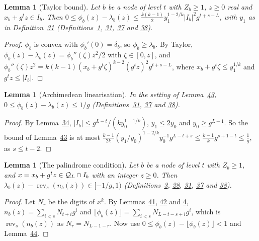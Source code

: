 \documentclass[11pt]{article}
\newcounter{hffc}
\theoremstyle{definition}\newtheorem{hffdef}[hffc]{Definition}
\theoremstyle{plain}\newtheorem{hfflem}[hffc]{Lemma}\newtheorem{hffthm}[hffc]{Theorem}
\theoremstyle{remark}\newtheorem{hffrem}[hffc]{Remark}
\newcommand{\hffcost}{}
\newcommand{\setcost}[1]{\renewcommand{\hffcost}{#1}}
\newcommand{\rev}{\operatorname{rev}}
\begin{document}
\begin{hfflem}[Taylor bound]\label{L:taylor}
Let $b$ be a node of level $t$ with $Z_b\ge1$, $z\ge0$ real and $x_b+g^tz\in I_b$. Then $0\le\phi_b(z)-\lambda_b(z)\le\frac{k(k-1)}2y_1^{1-2/k}|I_b|^2g^{t+s-L}$, with $y_1$ as in Definition~\hyperref[D:node]{31} (Definitions~\hyperref[D:conv]{1}, \hyperref[D:node]{31}, \hyperref[D:phase]{37} and \hyperref[D:arch]{38}).
\par\nopagebreak{}
\end{hfflem}
\begin{proof}\setcost{length 148/300}$\phi_b$ is convex with $\phi_b'(0)=\delta_b$, so $\phi_b\ge\lambda_b$. By Taylor, $\phi_b(z)-\lambda_b(z)=\phi_b''(\zeta)z^2/2$ with $\zeta\in[0,z]$, and $\phi_b''(\zeta)z^2=k(k-1)(x_b+g^t\zeta)^{k-2}(g^tz)^2g^{t+s-L}$, where $x_b+g^t\zeta\le y_1^{1/k}$ and $g^tz\le|I_b|$.
\end{proof}

\begin{hfflem}[Archimedean linearisation]\label{L:arch}
In the setting of Lemma~\hyperref[L:taylor]{43}, $0\le\phi_b(z)-\lambda_b(z)\le1/g$ (Definitions~\hyperref[D:node]{31}, \hyperref[D:phase]{37} and \hyperref[D:arch]{38}).
\par\nopagebreak{}
\end{hfflem}
\begin{proof}\setcost{length 125/300}By Lemma~\hyperref[L:mvt]{34}, $|I_b|\le g^{L-t}/(ky_0^{1-1/k})$, $y_1\le2y_0$ and $y_0\ge g^{L-1}$. So the bound of Lemma~\hyperref[L:taylor]{43} is at most $\frac{k-1}{2k}(y_1/y_0)^{1-2/k}y_0^{-1}g^{L-t+s}\le\frac{k-1}kg^{s+1-t}\le\frac1g$, as $s\le t-2$.
\end{proof}

\begin{hfflem}[The palindrome condition]\label{L:local}
Let $b$ be a node of level $t$ with $Z_b\ge1$, and $x=x_b+g^tz\in\mathcal{Q}_L\cap I_b$ with an integer $z\ge0$. Then $\lambda_b(z)-\rev_s(n_b(z))\in[-1/g,1)$ (Definitions~\hyperref[D:digits]{3}, \hyperref[D:pal]{28}, \hyperref[D:node]{31}, \hyperref[D:phase]{37} and \hyperref[D:arch]{38}).
\par\nopagebreak{}
\end{hfflem}
\begin{proof}\setcost{length 143/300}Let $N_r$ be the digits of $x^k$. By Lemmas~\hyperref[L:low]{41}, \hyperref[L:up]{42} and \hyperref[L:window]{4}, $n_b(z)=\sum_{i<s}N_{t+i}g^i$ and $\lfloor\phi_b(z)\rfloor=\sum_{i<s}N_{L-t-s+i}g^i$, which is $\rev_s(n_b(z))$ as $N_r=N_{L-1-r}$. Now use $0\le\phi_b(z)-\lfloor\phi_b(z)\rfloor<1$ and Lemma~\hyperref[L:arch]{44}.
\end{proof}
\end{document}
